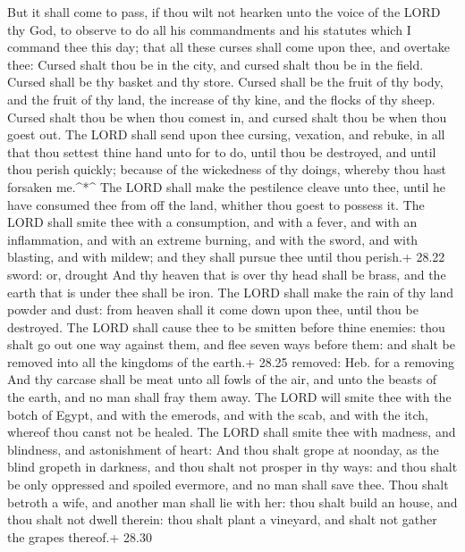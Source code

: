  But it shall come to pass, if thou wilt not hearken unto
the voice of the LORD thy God, to observe to do all his commandments and
his statutes which I command thee this day; that all these curses shall
come upon thee, and overtake thee:  Cursed shalt thou be in
the city, and cursed shalt thou be in the field.  Cursed
shall be thy basket and thy store.  Cursed shall be the
fruit of thy body, and the fruit of thy land, the increase of thy kine,
and the flocks of thy sheep.  Cursed shalt thou be when
thou comest in, and cursed shalt thou be when thou goest out.
 The LORD shall send upon thee cursing, vexation, and
rebuke, in all that thou settest thine hand unto for to do, until thou
be destroyed, and until thou perish quickly; because of the wickedness
of thy doings, whereby thou hast forsaken me.\^{}*\^{}  The
LORD shall make the pestilence cleave unto thee, until he have consumed
thee from off the land, whither thou goest to possess it. 
The LORD shall smite thee with a consumption, and with a fever, and with
an inflammation, and with an extreme burning, and with the sword, and
with blasting, and with mildew; and they shall pursue thee until thou
perish.+ 28.22 sword: or, drought  And thy heaven that is
over thy head shall be brass, and the earth that is under thee shall be
iron.  The LORD shall make the rain of thy land powder and
dust: from heaven shall it come down upon thee, until thou be destroyed.
 The LORD shall cause thee to be smitten before thine
enemies: thou shalt go out one way against them, and flee seven ways
before them: and shalt be removed into all the kingdoms of the earth.+
28.25 removed: Heb. for a removing  And thy carcase shall
be meat unto all fowls of the air, and unto the beasts of the earth, and
no man shall fray them away.  The LORD will smite thee with
the botch of Egypt, and with the emerods, and with the scab, and with
the itch, whereof thou canst not be healed.  The LORD shall
smite thee with madness, and blindness, and astonishment of heart:
 And thou shalt grope at noonday, as the blind gropeth in
darkness, and thou shalt not prosper in thy ways: and thou shalt be only
oppressed and spoiled evermore, and no man shall save thee.
 Thou shalt betroth a wife, and another man shall lie with
her: thou shalt build an house, and thou shalt not dwell therein: thou
shalt plant a vineyard, and shalt not gather the grapes thereof.+ 28.30
